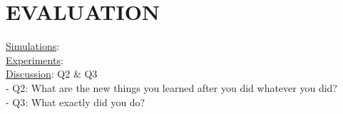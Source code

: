 \section{EVALUATION}
\uline{Simulations}:\\

\noindent\uline{Experiments}:\\

\noindent\uline{Discussion}: Q2 \& Q3\\
- Q2: What are the new things you learned after you did whatever you did?\\
- Q3: What exactly did you do?
